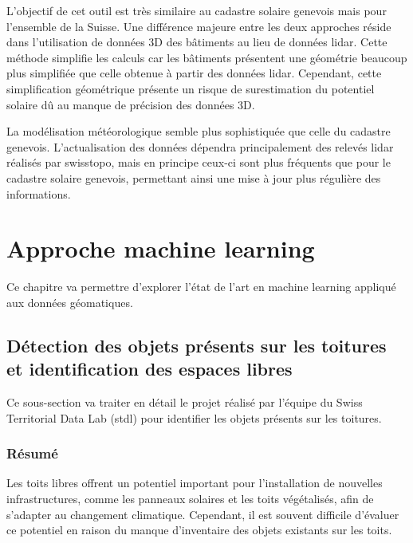 L'objectif de cet outil est très similaire au cadastre solaire genevois mais pour l'ensemble de la Suisse. Une différence majeure entre les deux approches réside dans l'utilisation de données 3D des bâtiments au lieu de données \gls{lidar}. Cette méthode simplifie les calculs car les bâtiments présentent une géométrie beaucoup plus simplifiée que celle obtenue à partir des données \gls{lidar}. Cependant, cette simplification géométrique présente un risque de surestimation du potentiel solaire dû au manque de précision des données 3D.

La modélisation météorologique semble plus sophistiquée que celle du cadastre genevois. L'actualisation des données dépendra principalement des relevés \gls{lidar} réalisés par swisstopo, mais en principe ceux-ci sont plus fréquents que pour le cadastre solaire genevois, permettant ainsi une mise à jour plus régulière des informations.

\section{Approche machine learning}

\par{Ce chapitre va permettre d'explorer l'état de l'art en machine learning appliqué aux données géomatiques.}

\subsection{Détection des objets présents sur les toitures et identification des espaces libres}
\label{subsec:stdl_analyse}
\vspace{2mm}
\par{Ce sous-section va traiter en détail le projet \cite{herny_detection_2024} réalisé par l'équipe du Swiss Territorial Data Lab (\acrshort{stdl}) pour identifier les objets présents sur les toitures.}

\subsubsection{Résumé}
\par{Les toits libres offrent un potentiel important pour l'installation de nouvelles infrastructures, comme les panneaux solaires et les toits végétalisés, afin de s'adapter au changement climatique. Cependant, il est souvent difficile d'évaluer ce potentiel en raison du manque d'inventaire des objets existants sur les toits.}


